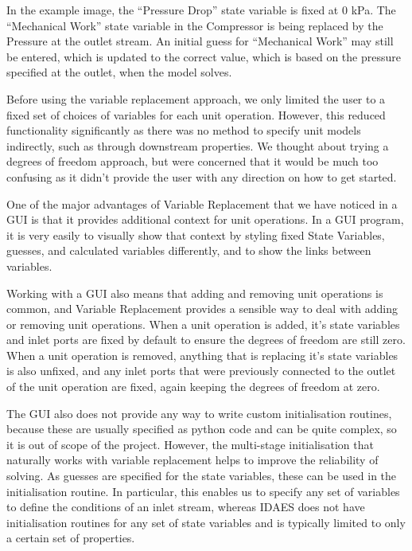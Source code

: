 In the example image, the ``Pressure Drop'' state variable is fixed at 0
kPa. The ``Mechanical Work'' state variable in the Compressor is being
replaced by the Pressure at the outlet stream. An initial guess for
``Mechanical Work'' may still be entered, which is updated to the
correct value, which is based on the pressure specified at the outlet,
when the model solves.

Before using the variable replacement approach, we only limited the user
to a fixed set of choices of variables for each unit operation. However,
this reduced functionality significantly as there was no method to
specify unit models indirectly, such as through downstream properties.
We thought about trying a degrees of freedom approach, but were
concerned that it would be much too confusing as it didn't provide the
user with any direction on how to get started.

One of the major advantages of Variable Replacement that we have noticed
in a GUI is that it provides additional context for unit operations. In
a GUI program, it is very easily to visually show that context by
styling fixed State Variables, guesses, and calculated variables
differently, and to show the links between variables.

Working with a GUI also means that adding and removing unit operations
is common, and Variable Replacement provides a sensible way to deal with
adding or removing unit operations. When a unit operation is added, it's
state variables and inlet ports are fixed by default to ensure the
degrees of freedom are still zero. When a unit operation is removed,
anything that is replacing it's state variables is also unfixed, and any
inlet ports that were previously connected to the outlet of the unit
operation are fixed, again keeping the degrees of freedom at zero.

The GUI also does not provide any way to write custom initialisation
routines, because these are usually specified as python code and can be
quite complex, so it is out of scope of the project. However, the
multi-stage initialisation that naturally works with variable
replacement helps to improve the reliability of solving. As guesses are
specified for the state variables, these can be used in the
initialisation routine. In particular, this enables us to specify any
set of variables to define the conditions of an inlet stream, whereas
IDAES does not have initialisation routines for any set of state
variables and is typically limited to only a certain set of properties.

